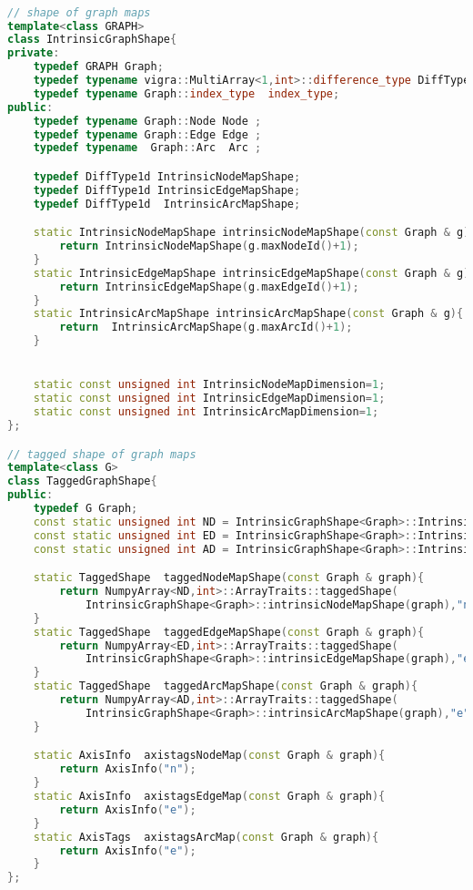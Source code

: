 \begin{lstlisting}[language=c++]

// shape of graph maps
template<class GRAPH>
class IntrinsicGraphShape{
private:
    typedef GRAPH Graph;
    typedef typename vigra::MultiArray<1,int>::difference_type DiffType1d;
    typedef typename Graph::index_type  index_type;
public:
    typedef typename Graph::Node Node ;
    typedef typename Graph::Edge Edge ;
    typedef typename  Graph::Arc  Arc ;

    typedef DiffType1d IntrinsicNodeMapShape;
    typedef DiffType1d IntrinsicEdgeMapShape;
    typedef DiffType1d  IntrinsicArcMapShape;

    static IntrinsicNodeMapShape intrinsicNodeMapShape(const Graph & g){
        return IntrinsicNodeMapShape(g.maxNodeId()+1);
    }
    static IntrinsicEdgeMapShape intrinsicEdgeMapShape(const Graph & g){
        return IntrinsicEdgeMapShape(g.maxEdgeId()+1);
    }
    static IntrinsicArcMapShape intrinsicArcMapShape(const Graph & g){
        return  IntrinsicArcMapShape(g.maxArcId()+1);
    }


    static const unsigned int IntrinsicNodeMapDimension=1;
    static const unsigned int IntrinsicEdgeMapDimension=1;
    static const unsigned int IntrinsicArcMapDimension=1;
};

// tagged shape of graph maps
template<class G>
class TaggedGraphShape{
public:
    typedef G Graph;
    const static unsigned int ND = IntrinsicGraphShape<Graph>::IntrinsicNodeMapDimension;
    const static unsigned int ED = IntrinsicGraphShape<Graph>::IntrinsicEdgeMapDimension;
    const static unsigned int AD = IntrinsicGraphShape<Graph>::IntrinsicArcMapDimension;

    static TaggedShape  taggedNodeMapShape(const Graph & graph){
        return NumpyArray<ND,int>::ArrayTraits::taggedShape(
            IntrinsicGraphShape<Graph>::intrinsicNodeMapShape(graph),"n");
    }
    static TaggedShape  taggedEdgeMapShape(const Graph & graph){
        return NumpyArray<ED,int>::ArrayTraits::taggedShape(
            IntrinsicGraphShape<Graph>::intrinsicEdgeMapShape(graph),"e");
    }
    static TaggedShape  taggedArcMapShape(const Graph & graph){
        return NumpyArray<AD,int>::ArrayTraits::taggedShape(
            IntrinsicGraphShape<Graph>::intrinsicArcMapShape(graph),"e");
    }

    static AxisInfo  axistagsNodeMap(const Graph & graph){
        return AxisInfo("n");
    }
    static AxisInfo  axistagsEdgeMap(const Graph & graph){
        return AxisInfo("e");
    }
    static AxisTags  axistagsArcMap(const Graph & graph){
        return AxisInfo("e");
    }
};
\end{lstlisting}



